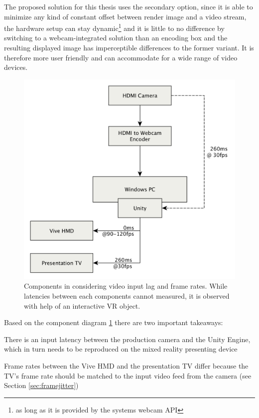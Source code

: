 The proposed solution for this thesis uses the secondary option, since it is 
able to minimize any kind of constant offset between render image and a video 
stream, the hardware setup can stay dynamic\footnote{as long as it is provided 
by the systems webcam API} and it is little to no difference by switching to a 
webcam-integrated solution than an encoding box and the resulting displayed 
image has imperceptible differences to the former variant. It is therefore more 
user friendly and can accommodate for a wide range of video devices.

\begin{figure}[htb]
	\includegraphics[width=\textwidth]{gfx/FPS-Timing-Components.png}
	\caption{Components in considering video input lag and frame rates. While 
	latencies between each components cannot measured, it is observed with help 
	of an interactive VR object.}
	\label{fig:offsets:components}
\end{figure}


Based on the component diagram \ref{fig:offsets:components} there are two 
important takeaways: 

\begin{my_list}
	\item There is an input latency between the production camera and the Unity 
	Engine, which in turn needs to be reproduced on the mixed reality 
	presenting device
	\item Frame rates between the Vive HMD and the presentation TV differ 
	because the TV's frame rate should be matched to the input video feed from 
	the camera (see Section \ref{sec:framejitter})
\end{my_list}

